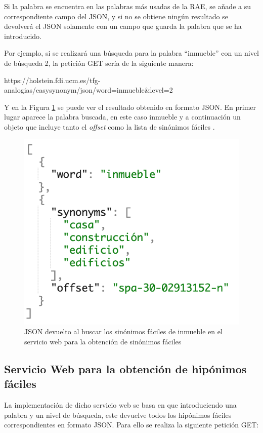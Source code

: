 Si la palabra se encuentra en las palabras más usadas de la RAE, se añade a su correspondiente campo del JSON, y si no se obtiene ningún resultado se devolverá el JSON solamente con un campo que guarda la palabra que se ha introducido.

Por ejemplo, si se realizará una búsqueda para la palabra ``inmueble'' con un nivel de búsqueda 2, la petición GET sería de la siguiente manera:

https://holstein.fdi.ucm.es/tfg-analogias/easysynonym/json/word=inmueble\&level=2

Y en la Figura \ref{fig:peticionGetEasySynonym} se puede ver el resultado obtenido en formato JSON. En primer lugar aparece la palabra buscada, en este caso inmueble y a continuación un objeto que incluye tanto el \textit{offset} como la lista de sinónimos fáciles .

\begin{figure}[!h]
	\includegraphics[width=.6\textwidth]{Imagenes/Bitmap/Capitulo5/peticionGetEasySynonym.png}
	\caption{JSON devuelto al buscar los sinónimos fáciles de inmueble en el servicio web para la obtención de sinónimos fáciles}
	\label{fig:peticionGetEasySynonym}
\end{figure}




\subsection{Servicio Web  para la obtención de hipónimos fáciles}
\label{cap:subsec:sw_hiponimosfaciles}
La implementación de dicho servicio web se basa en que introduciendo una palabra y un nivel de búsqueda, este devuelve todos los hipónimos fáciles correspondientes en formato JSON. Para ello se realiza la siguiente petición GET:

